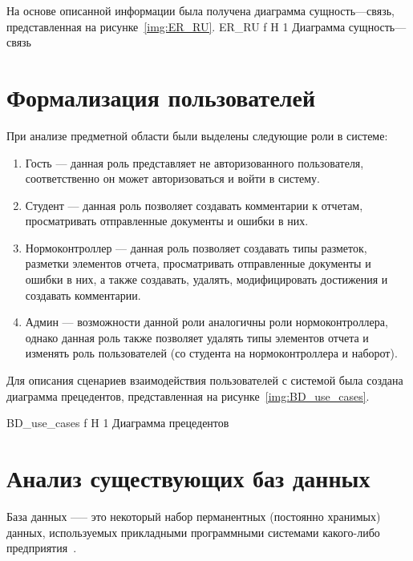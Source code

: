 \newpage
На основе описанной информации была получена диаграмма сущность---связь, представленная на рисунке~\ref{img:ER_RU}.
{ER_RU} %
{f} %
{H} %
{1\textwidth} %
{Диаграмма сущность---связь} %


\section{Формализация пользователей}
При анализе предметной области были выделены следующие роли в системе:
\begin{enumerate}
	\item Гость --- данная роль представляет не авторизованного пользователя, соответственно он может авторизоваться и войти в систему.
	\item Студент --- данная роль позволяет создавать комментарии к отчетам,
	просматривать отправленные документы и ошибки в них.
	\item Нормоконтроллер --- данная роль позволяет создавать типы разметок, разметки элементов отчета, просматривать отправленные документы и ошибки в них, а также создавать, удалять, модифицировать достижения и создавать комментарии.
	\item Админ --- возможности данной роли аналогичны роли нормоконтроллера, однако данная роль также позволяет удалять типы элементов отчета и изменять роль пользователей (со студента на нормоконтроллера и наборот).
\end{enumerate}


Для описания сценариев взаимодействия пользователей с системой была создана диаграмма прецедентов, представленная на рисунке~\ref{img:BD_use_cases}.

{BD_use_cases} %
{f} %
{H} %
{1\textwidth} %
{Диаграмма прецедентов} %


\section{Анализ существующих баз данных}
База данных —-- это некоторый набор перманентных (постоянно хранимых) данных, используемых прикладными программными системами какого-либо предприятия~\cite{williams-db}.

